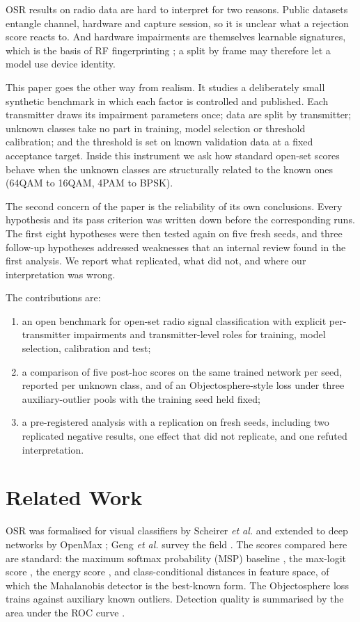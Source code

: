 \documentclass[journal]{IEEEtran}
\begin{document}
OSR results on radio data are hard to interpret for two reasons. Public
datasets entangle channel, hardware and capture session, so it is unclear what
a rejection score reacts to. And hardware impairments are themselves learnable
signatures, which is the basis of RF fingerprinting \cite{sankhe2019oracle}; a
split by frame may therefore let a model use device identity.

This paper goes the other way from realism. It studies a deliberately small
synthetic benchmark in which each factor is controlled and published. Each
transmitter draws its impairment parameters once; data are split by
transmitter; unknown classes take no part in training, model selection or
threshold calibration; and the threshold is set on known validation data at a
fixed acceptance target. Inside this instrument we ask how standard open-set
scores behave when the unknown classes are structurally related to the known
ones (64QAM to 16QAM, 4PAM to BPSK).

The second concern of the paper is the reliability of its own conclusions.
Every hypothesis and its pass criterion was written down before the
corresponding runs. The first eight hypotheses were then tested again on five
fresh seeds, and three follow-up hypotheses addressed weaknesses that an
internal review found in the first analysis. We report what replicated, what
did not, and where our interpretation was wrong.

The contributions are:
\begin{enumerate}
\item an open benchmark for open-set radio signal classification with explicit
per-transmitter impairments and transmitter-level roles for training, model
selection, calibration and test;
\item a comparison of five post-hoc scores on the same trained network per
seed, reported per unknown class, and of an Objectosphere-style loss
\cite{dhamija2018objectosphere} under three auxiliary-outlier pools with the
training seed held fixed;
\item a pre-registered analysis with a replication on fresh seeds, including
two replicated negative results, one effect that did not replicate, and one
refuted interpretation.
\end{enumerate}

\section{Related Work}
OSR was formalised for visual classifiers by Scheirer \emph{et al.}
\cite{scheirer2013openset} and extended to deep networks by OpenMax
\cite{bendale2016openmax}; Geng \emph{et al.} survey the field
\cite{geng2021survey}. The scores compared here are standard: the maximum
softmax probability (MSP) baseline \cite{hendrycks2017msp}, the max-logit
score \cite{hendrycks2022scaling}, the energy score \cite{liu2020energy}, and
class-conditional distances in feature space, of which the Mahalanobis
detector \cite{lee2018mahalanobis} is the best-known form. The Objectosphere
loss \cite{dhamija2018objectosphere} trains against auxiliary known outliers.
Detection quality is summarised by the area under the ROC curve
\cite{fawcett2006roc}.
\end{document}
